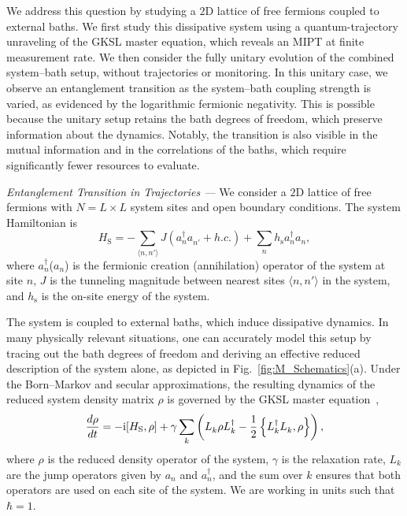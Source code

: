 \documentclass[reprint, superscriptaddress, aps, prl]{revtex4-2}
\newcommand{\im}{{\rm i}}
\begin{document}
We address this question by studying a $2$D lattice of free fermions coupled to external baths.
We first study this dissipative system using a quantum-trajectory unraveling of the GKSL master equation, which reveals an MIPT at finite measurement rate.
We then consider the fully unitary evolution of the combined system–bath setup, without trajectories or monitoring.
In this unitary case, we observe an entanglement transition as the system–bath coupling strength is varied, as evidenced by the logarithmic fermionic negativity.
This is possible because the unitary setup retains the bath degrees of freedom, which preserve information about the dynamics.
Notably, the transition is also visible in the mutual information and in the correlations of the baths, which require significantly fewer resources to evaluate.

\textit{Entanglement Transition in Trajectories ---}
We consider a $2$D lattice of free fermions with $N = L \times L$ system sites and open boundary conditions.
The system Hamiltonian is
\begin{equation}\label{eq:H_S}
    H_{\text{S}} = - \sum_{\langle n,n'\rangle} J ( a^\dagger_n a^{}_{n'} + h.c. ) + \sum_nh_{\text{s}} a^\dagger_n a^{}_n,
\end{equation}
where $a^{\dagger}_{n}$($a^{}_{n}$) is the fermionic creation (annihilation) operator of the system at site $n$, $J$ is the tunneling magnitude between nearest sites $\langle n,n'\rangle$ in the system, and $h_{\text{s}}$ is the on-site energy of the system.

The system is coupled to external baths, which induce dissipative dynamics.
In many physically relevant situations, one can accurately model this setup by tracing out the bath degrees of freedom and deriving an effective reduced description of the system alone, as depicted in Fig.~\ref{fig:M_Schematics}(a).
Under the Born–Markov and secular approximations, the resulting dynamics of the reduced system density matrix $\rho$ is governed by the GKSL master equation~\cite{Lindblad1976,GoriniSudarshan1976},
\begin{equation}\label{eq:GKSL}

    \frac{d\rho}{dt} = -\im [H_{\text{S}}, \rho] + \gamma\sum_k \left( L_{k}^{} \rho L_{k}^\dagger - \frac{1}{2} \left\{ L_{k}^\dagger L_k^{}, \rho \right\} \right)
,\end{equation}
where $\rho$ is the reduced density operator of the system, $\gamma$ is the relaxation rate, $L_k$ are the jump operators given by $a^{}_{n}$ and $a^{\dagger}_{n}$, and the sum over $k$ ensures that both operators are used on each site of the system. We are working in units such that $\hbar = 1$.
\end{document}
